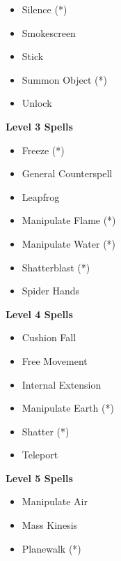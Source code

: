 \begin{multicols}{4}
{\begin{itemize}[itemsep=0em]
\item Silence (*) 

\item Smokescreen

\item Stick

\item Summon Object (*) 

\item Unlock


\end{itemize}
\textbf{Level 3 Spells}
\begin{itemize}[itemsep=0em]
\renewcommand\labelitemi{-}
\item Freeze (*) 

\item General Counterspell

\item Leapfrog

\item Manipulate Flame (*) 

\item Manipulate Water (*) 

\item Shatterblast (*) 

\item Spider Hands


\end{itemize}
\textbf{Level 4 Spells}
\begin{itemize}[itemsep=0em]
\renewcommand\labelitemi{-}
\item Cushion Fall

\item Free Movement

\item Internal Extension

\item Manipulate Earth (*) 

\item Shatter (*) 

\item Teleport


\end{itemize}
\textbf{Level 5 Spells}
\begin{itemize}[itemsep=0em]
\renewcommand\labelitemi{-}
\item Manipulate Air

\item Mass Kinesis

\item Planewalk (*) 



\end{itemize}}
\end{multicols}
